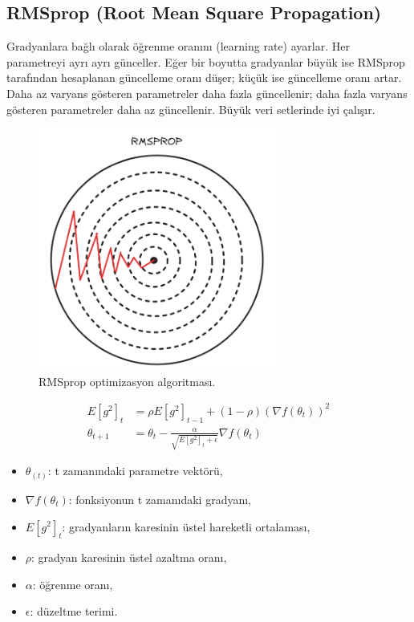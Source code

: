 \subsection{RMSprop (Root Mean Square Propagation)}
Gradyanlara bağlı olarak öğrenme oranını (learning rate) ayarlar. Her parametreyi ayrı ayrı günceller. Eğer bir boyutta gradyanlar büyük ise RMSprop tarafından hesaplanan güncelleme oranı düşer; küçük ise güncelleme oranı artar. Daha az varyans gösteren parametreler daha fazla güncellenir; daha fazla varyans gösteren parametreler daha az güncellenir. Büyük veri setlerinde iyi çalışır.

\begin{figure}[h]
    \centering
    \includegraphics[width=0.7\textwidth]{images/rmsprop_optimizer.png}
    \caption{RMSprop optimizasyon algoritması.}
    \label{fig:enter-label}
\end{figure}

\begin{align*}
E[g^2]_t & = \rho E[g^2]_{t-1} + (1 - \rho) (\nabla f(\theta_t))^2 \\
\theta_{t+1} & = \theta_t - \frac{\alpha}{\sqrt{E[g^2]_t + \epsilon}} \nabla f(\theta_t)
\end{align*}

\begin{itemize}
	\item $\theta_(t)$: t zamanındaki parametre vektörü,
	\item $\nabla f(\theta_{t})$: fonksiyonun t zamanıdaki gradyanı,
	\item $E[g^2]_t$: gradyanların karesinin üstel hareketli ortalaması,
	\item $\rho$: gradyan karesinin üstel azaltma oranı,
	\item $\alpha$: öğrenme oranı,
	\item $\epsilon$: düzeltme terimi.
\end{itemize}

